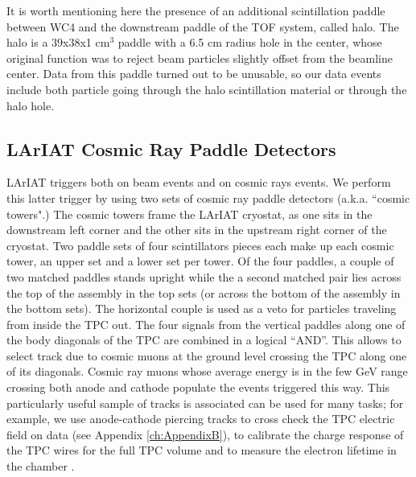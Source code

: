 It is worth mentioning here the presence of an additional scintillation paddle between WC4 and the downstream paddle of the TOF system, called halo. The halo is a 39x38x1 cm$^3$ paddle with a 6.5 cm radius hole in the center, whose original function was to reject  beam particles slightly offset from the beamline center. Data from this paddle turned out to be unusable, so our data events include both particle going through the halo scintillation material or through the halo hole.

\subsection{LArIAT Cosmic Ray Paddle Detectors}\label{sec:CosmicRayPaddle}
LArIAT triggers both on beam events and on cosmic rays events. We perform this latter trigger by using two sets of cosmic ray paddle detectors (a.k.a. ``cosmic towers".) The cosmic towers frame the LArIAT cryostat, as one sits in the downstream left corner and the other sits in the upstream right corner of the cryostat. Two paddle sets of four scintillators pieces each make up each cosmic tower, an upper set and a lower set per tower. 
Of the four paddles, a couple of two matched paddles stands upright while the a second matched pair lies across the top of the assembly in the top sets (or across the bottom of the assembly in the bottom sets). The horizontal couple is used as a veto for particles traveling from inside the TPC out.  The four signals  from the vertical paddles along one of the body diagonals of the TPC are combined in a logical ``AND''. This allows to select track due to cosmic muons at the ground level crossing the TPC along one of its diagonals.  Cosmic ray muons whose average energy is in the few GeV range crossing both anode and cathode populate the events triggered this way. This particularly useful sample of tracks is associated can be used for many tasks; for example, we use anode-cathode piercing tracks to cross check the TPC electric field on data (see Appendix \ref{ch:AppendixB}), to calibrate the charge response of the TPC wires for the full TPC volume and to measure the electron lifetime in the chamber \cite{LArIATLifeTime}.

